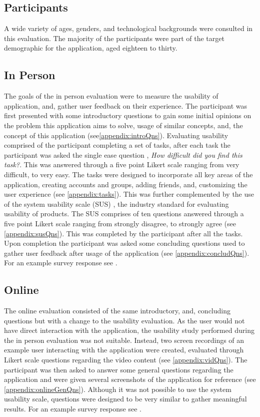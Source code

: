 \subsection*{Participants}
A wide variety of ages, genders, and technological backgrounds were consulted in this evaluation. The majority of the participants were part of the target demographic for the application, aged eighteen to thirty. 

\subsection{In Person}
The goals of the in person evaluation were to measure the usability of application, and, gather user feedback on their experience. The participant was first presented with some introductory questions to gain some initial opinions on the problem this application aims to solve, usage of similar concepts, and, the concept of this application (see\ref{appendix:introQns}).
Evaluating usability comprised of the participant completing a set of tasks, after each task the participant was asked the single ease question \cite{seq}, \textit{How difficult did you find this task?}. This was answered through a five point Likert scale ranging from very difficult, to very easy. The tasks were designed to incorporate all key areas of the application, creating accounts and groups, adding friends, and, customizing the user experience (see \ref{appendix:tasks}). This was further complemented by the use of the system usability scale (SUS) \cite{sus}, the industry standard for evaluating usability of products. The SUS comprises of ten questions answered through a five point Likert scale ranging from strongly disagree, to strongly agree (see \ref{appendix:susQns}). This was completed by the participant after all the tasks. Upon completion the participant was asked some concluding questions used to gather user feedback after usage of the application (see \ref{appendix:concludQns}). 
For an example survey response see \cite{evalRespWApp}.

\subsection{Online}
The online evaluation consisted of the same introductory, and, concluding questions but with a change to the usability evaluation. As the user would not have direct interaction with the application, the usability study performed during the in person evaluation was not suitable. Instead, two screen recordings of an example user interacting with the application were created, evaluated through Likert scale questions regarding the video content (see \ref{appendix:vidQns}). The participant was then asked to answer some general questions regarding the application and were given several screenshots of the application for reference (see \ref{appendix:onlineGenQns}). Although it was not possible to use the system usability scale, questions were designed to be very similar to gather meaningful results. For an example survey response see \cite{evalRespNoApp}. 

